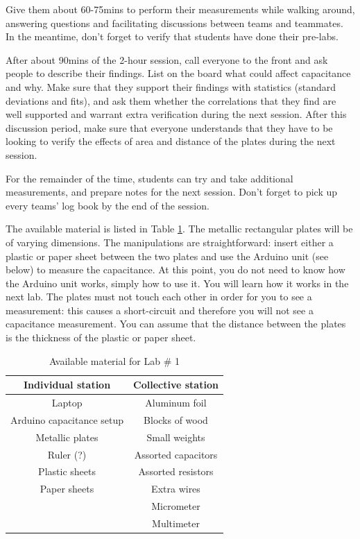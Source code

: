 \documentclass[12pt]{report}
\begin{document}
\begin{tcolorbox}
Give them about 60-75mins to perform their measurements while walking around, answering questions and facilitating discussions between teams and teammates. In the meantime, don't forget to verify that students have done their pre-labs.
\end{tcolorbox}

\begin{tcolorbox}
After about 90mins of the 2-hour session, call everyone to the front and ask people to describe their findings. List on the board what could affect capacitance and why. Make sure that they support their findings with statistics (standard deviations and fits), and ask them whether the correlations that they find are well supported and warrant extra verification during the next session. After this discussion period, make sure that everyone understands that they have to be looking to verify the effects of area and distance of the plates during the next session.
\end{tcolorbox}

\begin{tcolorbox}
For the remainder of the time, students can try and take additional measurements, and prepare notes for the next session. Don't forget to pick up every teams' log book by the end of the session.
\end{tcolorbox}

The available material is listed in Table \ref{Tab:Lab1-material}. The metallic rectangular plates will be of varying dimensions. The manipulations are straightforward: insert either a plastic or paper sheet between the two plates and use the Arduino unit (see below) to measure the capacitance. At this point, you do not need to know how the Arduino unit works, simply how to use it. You will learn how it works in the next lab. The plates must not touch each other in order for you to see a measurement: this causes a short-circuit and therefore you will not see a capacitance measurement. You can assume that the distance between the plates is the thickness of the plastic or paper sheet.
\begin{table}[h]
\centering
\begin{tabular}{||c | c ||}
\hline
Individual station & Collective station\\ \hline
Laptop & Aluminum foil \\
Arduino capacitance setup & Blocks of wood \\
Metallic plates & Small weights \\
Ruler (?) & Assorted capacitors \\
Plastic sheets & Assorted resistors \\
Paper sheets & Extra wires \\
& Micrometer \\
& Multimeter \\
\hline
\end{tabular}
\caption{Available material for Lab \# 1}
\label{Tab:Lab1-material}
\end{table}
\end{document}
